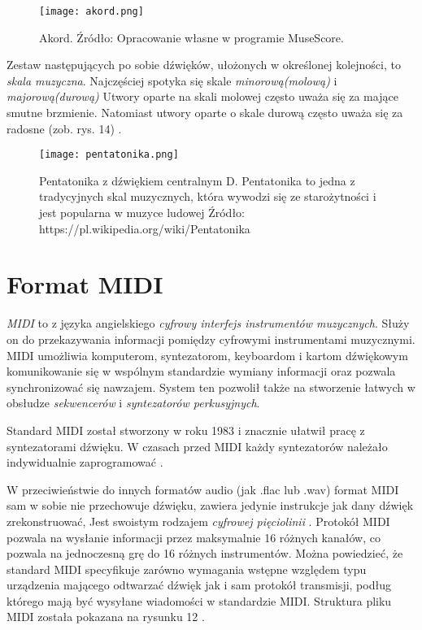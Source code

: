  \begin{figure}[H]
\texttt{[image: akord.png]}
\centering
\caption{Akord. Źródło: Opracowanie własne w programie MuseScore.}
\centering
\end{figure}

Zestaw następujących po sobie dźwięków, ułożonych w określonej kolejności, to \textit{skala muzyczna}. Najczęściej spotyka się skale \textit{minorową(molową)} i \textit{majorową(durową)} Utwory oparte na skali molowej często uważa się za mające smutne brzmienie. Natomiast utwory oparte o skale durową często uważa się za radosne (zob. rys. 14) \citep[s. 81 - 82]{Pilhofer2018}. 

 \begin{figure}[H]
\texttt{[image: pentatonika.png]}
\caption{Pentatonika z dźwiękiem centralnym D. Pentatonika to jedna z tradycyjnych skal muzycznych, która wywodzi się ze starożytności i jest popularna w muzyce ludowej  Źródło: https://pl.wikipedia.org/wiki/Pentatonika}
\centering
\end{figure}

\section{Format MIDI}
\textit{MIDI} to z języka angielskiego \textit{cyfrowy interfejs instrumentów muzycznych}. Służy on do przekazywania informacji pomiędzy cyfrowymi instrumentami muzycznymi. MIDI umożliwia komputerom, syntezatorom, keyboardom i kartom dźwiękowym komunikowanie się w wspólnym standardzie wymiany informacji oraz pozwala synchronizować się nawzajem. System ten pozwolił także na stworzenie łatwych w obsłudze \textit{sekwencerów} i \textit{syntezatorów perkusyjnych}.

Standard MIDI został stworzony w roku 1983 i znacznie ułatwił pracę z syntezatorami dźwięku. W czasach przed MIDI każdy syntezatorów należało indywidualnie zaprogramować \citep{MIDI}.

W przeciwieństwie do innych formatów audio (jak .flac lub .wav) format MIDI sam w sobie nie przechowuje dźwięku, zawiera jedynie instrukcje jak dany dźwięk zrekonstruować, Jest swoistym rodzajem \textit{cyfrowej pięciolinii} \citep[s. 1 - 2]{MIDI_Format}.
Protokół MIDI pozwala na wysłanie informacji przez maksymalnie 16 różnych kanałów, co pozwala na jednoczesną grę do 16 różnych instrumentów. Można powiedzieć, że standard MIDI specyfikuje zarówno wymagania wstępne względem typu urządzenia mającego odtwarzać dźwięk jak i sam protokół transmisji, podług którego mają być wysyłane wiadomości w standardzie MIDI. Struktura pliku MIDI została pokazana na rysunku 12 \citep[s. 1 - 2]{MIDI_Format}.

